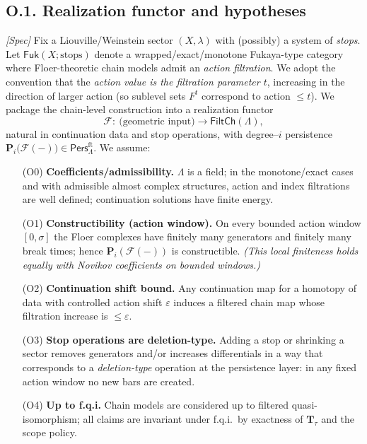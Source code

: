 \documentclass[11pt]{article}
\newcommand{\Pers}{\mathsf{Pers}}
\numberwithin{equation}{section}
\theoremstyle{definition}
\begin{document}
\subsection*{O.1. Realization functor and hypotheses}
\emph{[Spec]} Fix a Liouville/Weinstein sector \((X,\lambda)\) with (possibly) a system of \emph{stops}.
Let \(\mathsf{Fuk}(X;\mathrm{stops})\) denote a wrapped/exact/monotone Fukaya-type category where Floer-theoretic chain models admit an \emph{action filtration}.
We adopt the convention that the \emph{action value is the filtration parameter \(t\)}, increasing in the direction of larger action (so sublevel sets \(F^{t}\) correspond to action \(\le t\)).
We package the chain-level construction into a realization functor
\[
\mathcal{F}:\ \text{(geometric input)}\longrightarrow \mathsf{FiltCh}(\Lambda),
\]
natural in continuation data and stop operations, with degree–\(i\) persistence
\(\mathbf{P}_i\big(\mathcal{F}(-)\big)\in \Pers^{\mathrm{ft}}_\Lambda\).
We assume:

\begin{itemize}\setlength{\itemsep}{0.35em}
  \item[(O0)] \textbf{Coefficients/admissibility.} \(\Lambda\) is a field; in the monotone/exact cases and with admissible almost complex structures, action and index filtrations are well defined; continuation solutions have finite energy.

  \item[(O1)] \textbf{Constructibility (action window).} On every bounded action window \([0,\sigma]\) the Floer complexes have finitely many generators and finitely many break times; hence \(\mathbf{P}_i(\mathcal{F}(-))\) is constructible. \emph{(This local finiteness holds equally with Novikov coefficients on bounded windows.)}

  \item[(O2)] \textbf{Continuation shift bound.} Any continuation map for a homotopy of data with controlled action shift \(\varepsilon\) induces a filtered chain map whose filtration increase is \(\le \varepsilon\).

  \item[(O3)] \textbf{Stop operations are deletion-type.} Adding a stop or shrinking a sector removes generators and/or increases differentials in a way that corresponds to a \emph{deletion-type} operation at the persistence layer: in any fixed action window no new bars are created.

  \item[(O4)] \textbf{Up to f.q.i.} Chain models are considered up to filtered quasi-isomorphism; all claims are invariant under f.q.i.\ by exactness of \(\mathbf{T}_\tau\) and the scope policy.
\end{itemize}
\end{document}
